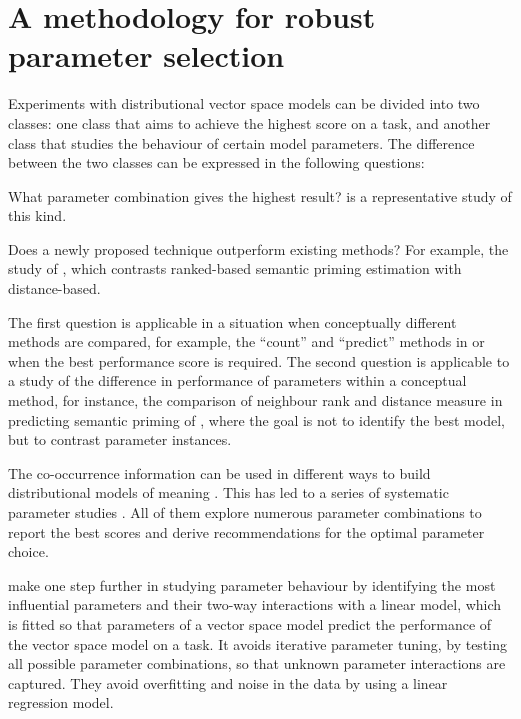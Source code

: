 \chapter{A methodology for robust parameter selection}
\label{sec:methodology}

Experiments with distributional vector space models can be divided into two classes: one class that aims to achieve the highest score on a task, and another class that studies the behaviour of certain model parameters. The difference between the two classes can be expressed in the following questions:

\begin{compactitem}
\item What parameter combination gives the highest result?  is a representative study of this kind.
\item Does a newly proposed technique outperform existing methods? For example, the
  study of , which contrasts ranked-based semantic priming estimation with distance-based.
\end{compactitem}

The first question is applicable in a situation when conceptually different methods are compared, for example, the ``count'' and  ``predict'' methods in  or when the best performance score is required. The second question is applicable to a study of the difference in performance of parameters within a conceptual method, for instance, the comparison of neighbour rank and distance measure in predicting semantic priming of , where the goal is not to identify the best model, but to contrast parameter instances.

The co-occurrence information can be used in different ways to build distributional models of meaning \cite{Turney:2010:FMV:1861751.1861756}. This has led to a series of  systematic parameter studies \cite{Bullinaria2007,BullinariaLevy2012,kiela-clark:2014:CVSC,lapesa2014large,TACL570,baroni-dinu-kruszewski:2014:P14-1}. All of them explore numerous parameter combinations to report the best scores and derive recommendations for the optimal parameter choice.

 make one step further in studying parameter behaviour by identifying the most influential parameters and their two-way interactions with a linear model, which is fitted so that parameters of a vector space model predict the performance of the vector space model on a task. It avoids iterative parameter tuning, by testing all possible parameter combinations, so that unknown parameter interactions are captured. They avoid overfitting\footnotemark{} and noise in the data by using a linear regression model.


